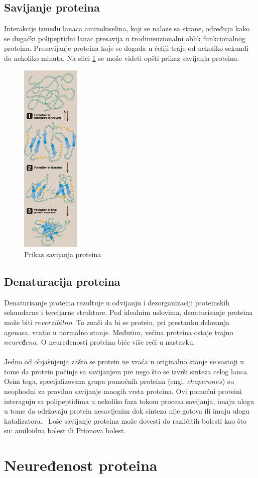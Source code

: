 \subsection{Savijanje proteina}
Interakcije između lanaca aminokiselina, koji se nalaze sa strane, određuju kako se dugački polipeptidni lanac presavija u trodimenzionalni oblik funkcionalnog proteina. Presavijanje proteina koje se događa u ćeliji traje od nekoliko sekundi do nekoliko minuta. 
Na slici \ref{fig:folding} se može videti opšti prikaz savijanja proteina.
\begin{figure}[h]
	\centering
    \includegraphics[width=0.25\textwidth]{Figures/BO/protein_folding.png}
    \caption{Prikaz savijanja proteina~\cite{lippincott}}
    \label{fig:folding}
\end{figure}

\subsection{Denaturacija proteina}
Denaturisanje proteina rezultuje u odvijanju i dezorganizaciji proteinskih sekundarne i tercijarne strukture. Pod idealnim uslovima, denaturisanje proteina može biti $reverzibilno$. To znači da bi se protein, pri prestanku delovanja agenasa, vratio u normalno stanje. Međutim, većina proteina ostaje trajno $neuređena$. O neuređenosti proteina biće više reči u nastavku.\\\\
Jedno od objašnjenja zašto se protein ne vraća u originalno stanje se sastoji u tome da protein počinje sa savijanjem pre nego što se izvrši sinteza celog lanca. Osim toga, specijalizovana grupa pomoćnih proteina (engl. $chaperones$) su neophodni za pravilno savijanje mnogih vrsta proteina. Ovi pomoćni proteini interaguju sa polipeptidima u nekoliko faza tokom procesa savijanja, imaju ulogu u tome da održavaju protein nesavijenim dok sinteza nije gotova ili imaju ulogu katalizatora.~\cite{lippincott} Loše savijanje proteina može dovesti do različitih bolesti kao što su: amiloidna bolest ili Prionova bolest.
\section{Neuređenost proteina}
